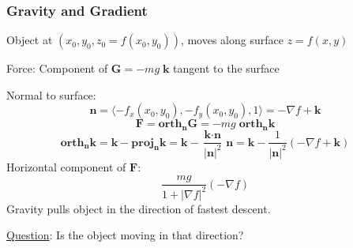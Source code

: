 \begin{frame}
  \frametitle{Gravity and Gradient}

  Object at $(x_0,y_0,z_0 = f(x_0,y_0))$, moves along surface $z=f(x,y)$
  \pause

  Force: Component of $\textbf{G}= -mg\; \textbf{k}$ tangent to the surface

  \pause
  Normal to surface:
  $$\textbf{n} = \langle -f_x(x_0,y_0), -f_y(x_0,y_0), 1\rangle = -\nabla f + \textbf{k}$$
  \pause
  $$\textbf{F} = \textbf{orth}_{\bm{n}} \textbf{G} =
  -mg \; \textbf{orth}_{\bm{n}} \textbf{k}$$
  \pause
  $$\textbf{orth}_{\bm{n}} \textbf{k} =
  \textbf{k} - \textbf{proj}_{\bm{n}} \textbf{k} =
  \textbf{k} - \frac{\textbf{k}\cdot \textbf{n}}{|\textbf{n}|^2} \, \textbf{n} =
  \textbf{k} - \frac{1}{|\textbf{n}|^2} (-\nabla f + \textbf{k})
  $$
\pause
Horizontal component of $\textbf{F}$:
%
$$\frac{mg}{1+|\nabla f|^2} (-\nabla f)$$
\pause
Gravity pulls object in the direction of fastest descent.

\pause
\underline{Question}: Is the object moving in that direction?

\end{frame}